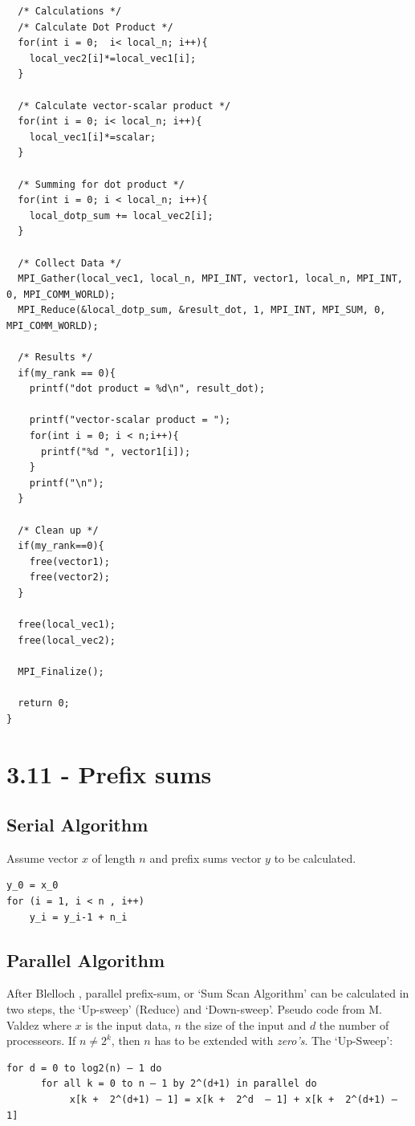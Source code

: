 \documentclass[a4paper,11pt,twoside]{article}
\begin{document}
\begin{verbatim}
  /* Calculations */
  /* Calculate Dot Product */
  for(int i = 0;  i< local_n; i++){
    local_vec2[i]*=local_vec1[i];
  }

  /* Calculate vector-scalar product */
  for(int i = 0; i< local_n; i++){
    local_vec1[i]*=scalar;
  }

  /* Summing for dot product */
  for(int i = 0; i < local_n; i++){
    local_dotp_sum += local_vec2[i];    
  } 
 
  /* Collect Data */
  MPI_Gather(local_vec1, local_n, MPI_INT, vector1, local_n, MPI_INT, 0, MPI_COMM_WORLD);
  MPI_Reduce(&local_dotp_sum, &result_dot, 1, MPI_INT, MPI_SUM, 0, MPI_COMM_WORLD);

  /* Results */
  if(my_rank == 0){
    printf("dot product = %d\n", result_dot);

    printf("vector-scalar product = ");
    for(int i = 0; i < n;i++){
      printf("%d ", vector1[i]);
    }
    printf("\n");
  }

  /* Clean up */
  if(my_rank==0){
    free(vector1);
    free(vector2);
  }
  
  free(local_vec1);
  free(local_vec2);

  MPI_Finalize();

  return 0;
} 
\end{verbatim}

\section{3.11 - Prefix sums}
\subsection*{Serial Algorithm}
Assume vector $x$ of length $n$ and prefix sums vector $y$ to be calculated.
\begin{verbatim}
y_0 = x_0
for (i = 1, i < n , i++)
    y_i = y_i-1 + n_i
\end{verbatim}

\subsection*{Parallel Algorithm}
After Blelloch \cite{blelloch1990}, parallel prefix-sum, or `Sum Scan Algorithm' can be calculated in two steps, the `Up-sweep' (Reduce) and `Down-sweep'. Pseudo code from M. Valdez \cite{valdez2012} where $x$ is the input data, $n$ the size of the input and $d$ the number of processeors. If $n \neq 2^{k}$, then $n$ has to be extended with \textit{zero's}. The `Up-Sweep':
\begin{verbatim}
for d = 0 to log2(n) – 1 do 
      for all k = 0 to n – 1 by 2^(d+1) in parallel do 
           x[k +  2^(d+1) – 1] = x[k +  2^d  – 1] + x[k +  2^(d+1) – 1]
\end{verbatim}
\end{document}

